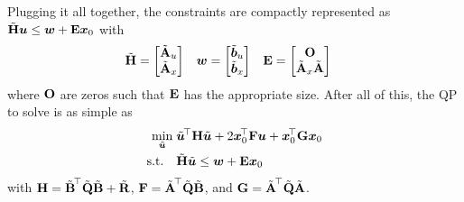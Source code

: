 			Plugging it all together, the constraints are compactly represented as \( \tilde{\bm{\mathrm{H}}} \bm{u} \leq \bm{w} + \bm{\mathrm{E}} \bm{x}_0 \) with
			\begin{align}
				\tilde{\bm{\mathrm{H}}} & = \begin{bmatrix} \tilde{\bm{\mathrm{A}}}_u \\ \tilde{\bm{\mathrm{A}}}_x \end{bmatrix}       &
				\bm{w}         & = \begin{bmatrix} \tilde{\bm{b}}_u \\ \tilde{\bm{b}}_x \end{bmatrix}       &
				\bm{\mathrm{E}}         & = \begin{bmatrix} \bm{\mathrm{O}} \\ \tilde{\bm{\mathrm{A}}}_x \tilde{\bm{\mathrm{A}}} \end{bmatrix}
			\end{align}
			where \(\bm{\mathrm{O}}\) are zeros such that \(\bm{\mathrm{E}}\) has the appropriate size. After all of this, the QP to solve is as simple as
			\begin{equation}
				\begin{aligned}
					\min_{\tilde{\bm{u}}}\; & \tilde{\bm{u}}^{\!\top} \bm{\mathrm{H}} \tilde{\bm{u}} + 2 \bm{x}_0^{\!\top} \bm{\mathrm{F}} \bm{u} + \bm{x}_0^{\!\top} \bm{\mathrm{G}} \bm{x}_0 \\
					\text{s.t.}\quad         &
					\begin{aligned}
						\tilde{\bm{\mathrm{H}}} \tilde{\bm{u}} & \leq \bm{w} + \bm{\mathrm{E}} \bm{x}_0
					\end{aligned}
				\end{aligned}
				\label{eqn:qpA}
			\end{equation}
			with \( \bm{\mathrm{H}} = \tilde{\bm{\mathrm{B}}}^{\!\top} \tilde{\bm{\mathrm{Q}}} \tilde{\bm{\mathrm{B}}} + \tilde{\bm{\mathrm{R}}} \), \( \bm{\mathrm{F}} = \tilde{\bm{\mathrm{A}}}^{\!\top} \tilde{\bm{\mathrm{Q}}} \tilde{\bm{\mathrm{B}}} \), and \( \bm{\mathrm{G}} = \tilde{\bm{\mathrm{A}}}^{\!\top} \tilde{\bm{\mathrm{Q}}} \tilde{\bm{\mathrm{A}}} \).

